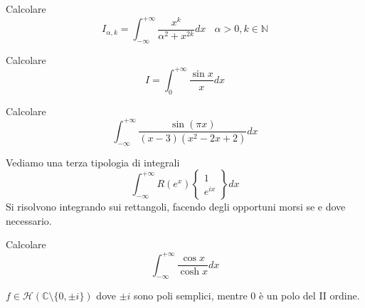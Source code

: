 \begin{figure}[htpb]
\end{figure}
\FloatBarrier
Calcolare
\begin{equation*}
I_{\alpha ,k} =\int ^{+\infty }_{-\infty }\frac{x^{k}}{\alpha ^{2} +x^{2k}} dx\ \ \ \ \alpha  >0,k\in \mathbb{N}
\end{equation*}
\Esercizio{}

Calcolare
\begin{equation*}
I=\int ^{+\infty }_{0}\frac{\sin x}{x} dx
\end{equation*}
\Esercizio{}

Calcolare
\begin{equation*}
\int ^{+\infty }_{-\infty }\frac{\sin\left( \pi x\right)}{\left( x-3\right)\left( x^{2} -2x+2\right)} dx
\end{equation*}
\Esercizio{}

Vediamo una terza tipologia di integrali
\begin{equation*}
\boxed{\int ^{+\infty }_{-\infty } R\left( e^{x}\right)\left\{\begin{array}{ c }
1\\
e^{ix}
\end{array}\right\} dx}
\end{equation*}
Si risolvono integrando sui rettangoli, facendo degli opportuni morsi se e dove necessario.

Calcolare
\begin{equation*}
\int ^{+\infty }_{-\infty }\frac{\cos x}{\cosh x} dx
\end{equation*}
\ParteSoluzioni
\Soluzione

$f\in \mathcal{H}(\mathbb{C} \setminus \{0,\pm i\})$ dove $\pm i$ sono poli semplici, mentre $0$ è un polo del II ordine. 


